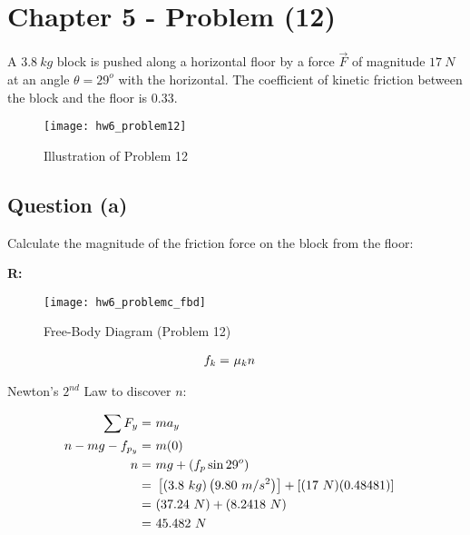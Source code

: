 \section{Chapter 5 - Problem (12)}
	A $3.8 \ kg$ block is pushed along a horizontal floor by a force $\vec{F}$ of magnitude $17 \ N$ at an angle $\theta = 29^{o}$ with the horizontal. The coefficient of kinetic friction between the block and the floor is $0.33$.

	\begin{figure}[H]
		\begin{center}
			\texttt{[image: hw6\_problem12]}
			\caption{Illustration of Problem 12}
			\label{fig:hw6_problem12}
		\end{center}
	\end{figure}

	\subsection{Question (a)}

		Calculate the magnitude of the friction force on the block from the floor:

		\textbf{R:} \newline

		\begin{figure}[H]
			\begin{center}
				\texttt{[image: hw6\_problemc\_fbd]}
				\caption{Free-Body Diagram (Problem 12)}
				\label{fig:hw6_problemc_fbd}
			\end{center}
		\end{figure}

		\begin{align}
			f_{k} = \ &\mu_{k}n& \notag
		\end{align}

		Newton's $2^{nd}$ Law to discover $n$:

		\begin{align}
			\sum F_{y} = \ &ma_{y}& \notag \\
			n - mg - f_{p_{y}} = \ &m(0)& \notag \\
			n = \ &mg + (f_{p} \sin 29^{o})& \notag \\
			= \ &\left[(3.8 \ kg)\left(9.80 \ m/s^{2}\right)\right] + \left[(17 \ N)(0.48481)\right]& \notag \\
			= \ &(37.24 \ N) + (8.2418 \ N)& \notag \\
			= \ &45.482 \ N& \notag
		\end{align}

